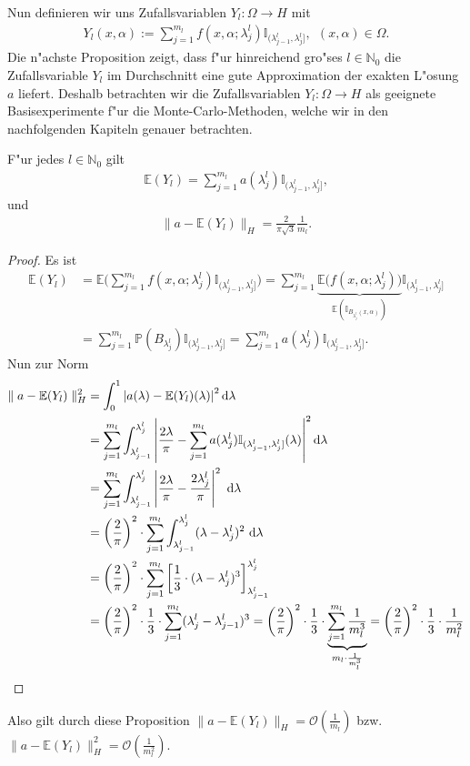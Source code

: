 Nun definieren wir uns Zufallsvariablen $Y_l:\Omega \rightarrow H$ mit 
\begin{align}\label{lustige_gleichung}
 Y_l(x,\alpha):=\sum_{j=1}^{m_l} f(x,\alpha;\lambda_j^l)\mathbb{I}_{(\lambda_{j-1}^l,\lambda_j^l]}, \ \ (x,\alpha)\in \Omega.
\end{align}
Die n"achste Proposition zeigt, dass f"ur hinreichend gro"ses $l\in\mathbb{N}_0$ die Zufallsvariable $Y_l$ im Durchschnitt eine gute Approximation der exakten L"osung $a$ liefert. Deshalb betrachten wir die Zufallsvariablen $Y_l:\Omega \rightarrow H$ als geeignete Basisexperimente f"ur die Monte-Carlo-Methoden, welche wir in den nachfolgenden Kapiteln genauer betrachten.

\begin{prop}
F"ur jedes $l\in\mathbb{N}_0$ gilt
\begin{align*}
\mathbb{E}(Y_l)=\sum_{j=1}^{m_l} a(\lambda_j^l)\mathbb{I}_{(\lambda_{j-1}^l,\lambda_j^l]},
\end{align*}
und
\begin{align*}
\parallel a-\mathbb{E}(Y_l)\parallel_H=\frac{2}{\pi \sqrt{3}}\frac{1}{m_l}.
\end{align*}
\end{prop}
\begin{proof}
Es ist
\begin{align*}
\mathbb{E}(Y_l)&=\mathbb{E}\Big(\sum_{j=1}^{m_l} f(x,\alpha;\lambda_j^l)\mathbb{I}_{(\lambda_{j-1}^l,\lambda_j^l]}\Big)
=\sum_{j=1}^{m_l} \underbrace{\mathbb{E}\Big(f(x,\alpha;\lambda_j^l)\Big)}_{\mathbb{E}(\mathbb{I}_{B_{\lambda_j^l}(x,\alpha)})}\mathbb{I}_{(\lambda_{j-1}^l,\lambda_j^l]}\\
&=\sum_{j=1}^{m_l}\mathbb{P}(B_{\lambda_j^l})\mathbb{I}_{(\lambda_{j-1}^l,\lambda_j^l]}=\sum_{j=1}^{m_l} a(\lambda_j^l)\mathbb{I}_{(\lambda_{j-1}^l,\lambda_j^l]}.
\end{align*}
Nun zur Norm
\begin{align*}
\parallel a-\mathbb{E}(Y_l)\parallel_H^2&=\int_0^1 \left| a(\lambda)-\mathbb{E}(Y_l)(\lambda)\right|^2 \text{d}\lambda\\&=
\sum_{j=1}^{m_l}\int_{\lambda_{j-1}^l}^{\lambda_j^l} \left| \frac{2\lambda}{\pi}-\sum_{j=1}^{m_l} a(\lambda_j^l)\mathbb{I}_{(\lambda_{j-1}^l,\lambda_j^l]}(\lambda)\right|^2\text{d}\lambda\\&=
\sum_{j=1}^{m_l}\int_{\lambda_{j-1}^l}^{\lambda_j^l} \left|\frac{2\lambda}{\pi}-\frac{2\lambda_j^l}{\pi}\right|^2\text{ d} \lambda\\&=\left(\frac{2}{\pi}\right)^2\cdot \sum_{j=1}^{m_l}\int_{\lambda_{j-1}^l}^{\lambda_j^l}(\lambda-\lambda_j^l)^2\text{ d} \lambda\\&=\left(\frac{2}{\pi}\right)^2\cdot\sum_{j=1}^{m_l}\left[\frac{1}{3}\cdot(\lambda-\lambda_j^l)^3\right]_{\lambda_{j-1}^l}^{\lambda_j^l}\\&=\left(\frac{2}{\pi}\right)^2\cdot \frac{1}{3}\cdot\sum_{j=1}^{m_l}(\lambda_j^l-\lambda_{j-1}^l)^3=\left(\frac{2}{\pi}\right)^2\cdot \frac{1}{3}\cdot \underbrace{\sum_{j=1}^{m_l}\frac{1}{m_l^3}}_{m_l\cdot \frac{1}{m_l^3}}=\left(\frac{2}{\pi}\right)^2\cdot \frac{1}{3}\cdot \frac{1}{m_l^2}
\end{align*}
\end{proof}

Also gilt durch diese Proposition $\parallel a-\mathbb{E}(Y_l)\parallel_H=\mathcal{O}\left(\frac{1}{m_l}\right)$ bzw. $\parallel a-\mathbb{E}(Y_l)\parallel_H^2=\mathcal{O}\left(\frac{1}{m_l^2}\right)$. 
